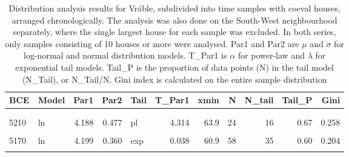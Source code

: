 \documentclass[
  12pt,
  a4paper, twoside]{book}
\begin{document}
\begin{landscape}\begin{table}

\caption[Distribution fitting results, Vráble time samples]{\label{tab:06-time-tab}Distribution analysis results for Vráble, subdivided into time samples with coeval houses, arranged chronologically. The analysis was also done on the South-West neighbourhood separately, where the single largest house for each sample was excluded. In both series, only samples consisting of 10 houses or more were analysed. Par1 and Par2 are \(\mu\) and \(\sigma\) for log-normal and normal distribution models. T\_Par1 is \(\alpha\) for power-law and \(\lambda\) for exponential tail models. Tail\_P is the proportion of data points (N) in the tail model (N\_Tail), or N\_Tail/N. Gini index is calculated on the entire sample distribution}
\centering
\begin{tabular}[t]{llrrlrrrrrr}
\toprule
BCE & Model & Par1 & Par2 & Tail & T\_Par1 & xmin & N & N\_tail & Tail\_P & Gini\\
\midrule
\addlinespace[0.3em]
\multicolumn{11}{l}{\textbf{Vráble}}\\
\hspace{1em}\cellcolor{gray!6}{5230} & \cellcolor{gray!6}{ln} & \cellcolor{gray!6}{4.059} & \cellcolor{gray!6}{0.487} & \cellcolor{gray!6}{pl} & \cellcolor{gray!6}{4.232} & \cellcolor{gray!6}{63.5} & \cellcolor{gray!6}{12} & \cellcolor{gray!6}{6} & \cellcolor{gray!6}{0.50} & \cellcolor{gray!6}{0.279}\\
\hspace{1em}5210 & ln & 4.188 & 0.477 & pl & 4.314 & 63.9 & 24 & 16 & 0.67 & 0.258\\
\hspace{1em}\cellcolor{gray!6}{5190} & \cellcolor{gray!6}{ln} & \cellcolor{gray!6}{4.114} & \cellcolor{gray!6}{0.372} & \cellcolor{gray!6}{exp} & \cellcolor{gray!6}{0.041} & \cellcolor{gray!6}{51.4} & \cellcolor{gray!6}{38} & \cellcolor{gray!6}{28} & \cellcolor{gray!6}{0.74} & \cellcolor{gray!6}{0.210}\\
\hspace{1em}5170 & ln & 4.199 & 0.360 & exp & 0.038 & 60.9 & 58 & 35 & 0.60 & 0.204\\
\hspace{1em}\cellcolor{gray!6}{5150} & \cellcolor{gray!6}{ln} & \cellcolor{gray!6}{4.288} & \cellcolor{gray!6}{0.398} & \cellcolor{gray!6}{pl} & \cellcolor{gray!6}{5.235} & \cellcolor{gray!6}{85.0} & \cellcolor{gray!6}{53} & \cellcolor{gray!6}{22} & \cellcolor{gray!6}{0.42} & \cellcolor{gray!6}{0.228}\\

\end{tabular}
\end{table}
\end{landscape}
\end{document}
